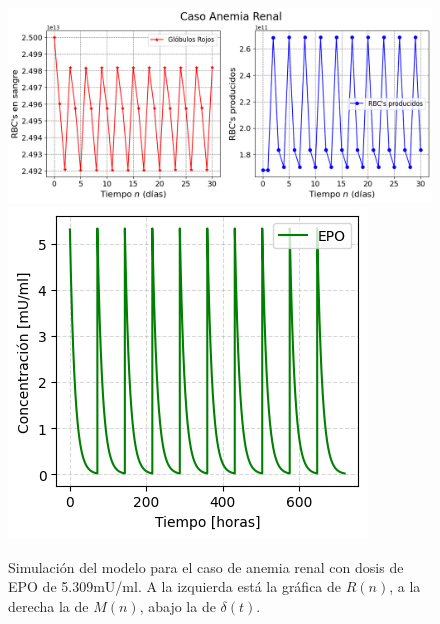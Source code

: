 \begin{figure}[H]
    \centering
    \captionsetup{justification=centering}
    \includegraphics[scale=0.526]{figures/AR21.png}
    \includegraphics[scale=0.8]{figures/AR22.png}
    \caption{Simulación del modelo para el caso de anemia renal con dosis de EPO de 5.309mU/ml. A la izquierda está la gráfica de $R(n)$, a la derecha la de $M(n)$, abajo la de $\delta(t)$.}
    \label{sec:variaciones:fig:Anemia2}
\end{figure}

